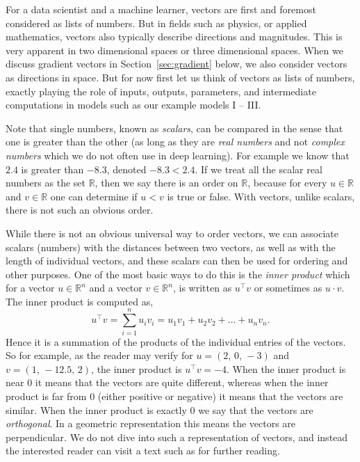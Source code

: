 For a data scientist and a machine learner, vectors are first and foremost considered as lists of numbers. But in fields such as physics, or applied mathematics, vectors also typically describe directions and magnitudes. This is very apparent in two dimensional spaces or three dimensional spaces. When we discuss gradient vectors in Section~\ref{sec:gradient} below, we also consider vectors as directions in space. But for now first let us think of vectors as lists of numbers, exactly playing the role of inputs, outputs, parameters, and intermediate computations in models such as our example models I -- III.

Note that single numbers, known as {\em scalars}, can be compared in the sense that one is greater than the other (as long as they are {\em real numbers} and not {\em complex numbers} which we do not often use in deep learning). For example we know that $2.4$ is greater than $-8.3$, denoted $-8.3 < 2.4$. If we treat all the scalar real numbers as the set ${\mathbb R}$, then we say there is an order on ${\mathbb R}$, because for every $u \in {\mathbb R}$ and $v \in {\mathbb R}$ one can determine if $u < v$ is true or false. With vectors, unlike scalars, there is not such an obvious order. 

While there is not an obvious universal way to order vectors, we can associate scalars (numbers) with the distances between two vectors, as well as with the length of individual vectors, and these scalars can then be used for ordering and other purposes. One of the most basic ways to do this is the {\em inner product} which for a vector $u \in {\mathbb R}^n$ and a vector $v \in {\mathbb R}^n$, is written as $u^\top v$ or sometimes as $u \cdot v$. The inner product is computed as,
%
\begin{equation}
\label{eq:inner product}
u^\top v = \sum_{i=1}^n u_i v_i = u_1 v_1 + u_2 v_2 + \ldots + u_n v_n.
\end{equation}
%
Hence it is a summation of the products of the individual entries of the vectors. So for example, as the reader may verify for $u=(2,\, 0, \, -3)$ and $v=(1,\, -12.5, \, 2)$, the inner product is $u^\top v = -4$. When the inner product is near $0$ it means that the vectors are quite different, whereas when the inner product is far from $0$ (either positive or negative) it means that the vectors are similar. When the inner product is exactly $0$ we say that the vectors are {\em orthogonal}. In a geometric representation this means the vectors are perpendicular. We do not dive into such a representation of vectors, and instead the interested reader can visit a text such as \cite{boyd2018introduction} for further reading.

